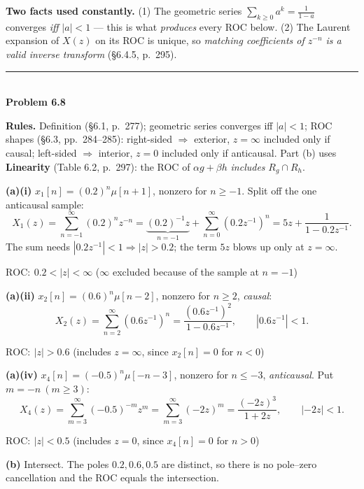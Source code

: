 \documentclass[11pt,letterpaper]{article}
\newcommand{\prob}[2]{\vspace{2ex}\noindent\rule{\linewidth}{1pt}\\[0.4ex]
  {\large\bfseries Problem #1}\quad{\itshape #2}\par\vspace{0.6ex}}
\newcommand{\ROC}{\textrm{ROC}}
\begin{document}
\medskip
\begin{rules}
\textbf{Two facts used constantly.}\quad
(1) The geometric series $\sum_{k\ge 0}a^k=\frac{1}{1-a}$ converges \emph{iff} $|a|<1$ --- this is what
\emph{produces} every ROC below.
(2) The Laurent expansion of $X(z)$ on its ROC is unique, so \emph{matching coefficients of $z^{-n}$ is a
valid inverse transform} (\S6.4.5, p.~295).
\end{rules}

\prob{6.8}{Regions of convergence}

\begin{rules}
\textbf{Rules.} Definition (\S6.1, p.~277); geometric series converges iff $|a|<1$;
ROC shapes (\S6.3, pp.~284--285): right-sided $\Rightarrow$ exterior, $z=\infty$ included only if
causal; left-sided $\Rightarrow$ interior, $z=0$ included only if anticausal.
Part (b) uses \textbf{Linearity} (Table 6.2, p.~297): the ROC of $\alpha g+\beta h$ \emph{includes}
$R_g\cap R_h$.
\end{rules}

\textbf{(a)(i)} $x_1[n]=(0.2)^n\mu[n+1]$, nonzero for $n\ge-1$. Split off the one anticausal sample:
\[
X_1(z)=\sum_{n=-1}^{\infty}(0.2)^n z^{-n}
      =\underbrace{(0.2)^{-1}z}_{n=-1}+\sum_{n=0}^{\infty}(0.2z^{-1})^n
      =5z+\frac{1}{1-0.2z^{-1}}.
\]
The sum needs $|0.2z^{-1}|<1\Rightarrow|z|>0.2$; the term $5z$ blows up only at $z=\infty$.
\begin{ans}$\ROC:\ 0.2<|z|<\infty$ \quad($\infty$ excluded because of the sample at $n=-1$)\end{ans}

\textbf{(a)(ii)} $x_2[n]=(0.6)^n\mu[n-2]$, nonzero for $n\ge2$, \emph{causal}:
\[
X_2(z)=\sum_{n=2}^{\infty}(0.6z^{-1})^n=\frac{(0.6z^{-1})^2}{1-0.6z^{-1}},\qquad |0.6z^{-1}|<1 .
\]
\begin{ans}$\ROC:\ |z|>0.6$ \quad(includes $z=\infty$, since $x_2[n]=0$ for $n<0$)\end{ans}

\textbf{(a)(iv)} $x_4[n]=(-0.5)^n\mu[-n-3]$, nonzero for $n\le-3$, \emph{anticausal}. Put $m=-n\ (m\ge3)$:
\[
X_4(z)=\sum_{m=3}^{\infty}(-0.5)^{-m}z^{m}=\sum_{m=3}^{\infty}(-2z)^m=\frac{(-2z)^3}{1+2z},
\qquad |-2z|<1 .
\]
\begin{ans}$\ROC:\ |z|<0.5$ \quad(includes $z=0$, since $x_4[n]=0$ for $n>0$)\end{ans}

\textbf{(b)} Intersect. The poles $0.2,0.6,0.5$ are distinct, so there is no pole--zero cancellation
and the ROC equals the intersection.
\end{document}
